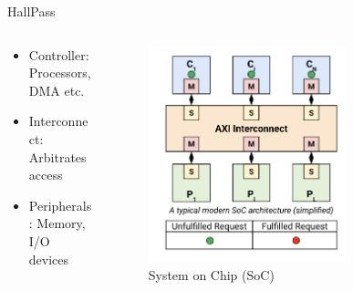 \begin{frame}{HallPass}
    \begin{columns}
        \begin{column}{0.5\textwidth}
            \begin{itemize}
                \item Controller: Processors, DMA etc.
                \item Interconnect: Arbitrates access
                \item Peripherals: Memory, I/O devices
            \end{itemize} 
        \end{column}
        \begin{column}{0.5\textwidth}
            \begin{figure}
                \centering
                \includegraphics[height=0.7\textheight,width=0.7\textwidth,keepaspectratio]{SoC.png}
                \caption{System on Chip (SoC)}
            \end{figure}
            \end{column}
    \end{columns}
\end{frame}

